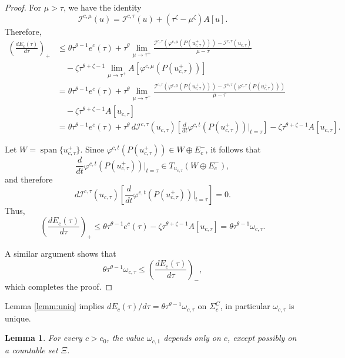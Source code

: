 \documentclass{amsart}
\theoremstyle{plain}
\newtheorem{lemma}[theorem]{Lemma}
\theoremstyle{definition}
\theoremstyle{remark}
\numberwithin{equation}{section} \numberwithin{figure}{section}
\begin{document}
{\begin{proof}
For \( \mu > \tau \), we have the identity
\[
\mathcal{I}^{c, \mu}(u) = \mathcal{I}^{c, \tau}(u) + (\tau^\zeta - \mu^\zeta) A[u].
\]
Therefore,
\begin{align*}
\left(\frac{d E_c(\tau)}{d \tau}\right)_+ 
&\leq \theta \tau^{\theta - 1} e^c(\tau) + \tau^\theta \lim_{\mu \to \tau^+} \frac{\mathcal{I}^{c, \tau}(\varphi^{c, \mu}(P(u_{c, \tau}^+))) - \mathcal{I}^{c, \tau}(u_{c, \tau})}{\mu - \tau} \\
&\quad - \zeta \tau^{\theta + \zeta - 1} \lim_{\mu \to \tau^+} A[\varphi^{c, \mu}(P(u_{c, \tau}^+))] \\
&= \theta \tau^{\theta - 1} e^c(\tau) + \tau^\theta \lim_{\mu \to \tau^+} \frac{\mathcal{I}^{c, \tau}(\varphi^{c, \mu}(P(u_{c, \tau}^+))) - \mathcal{I}^{c, \tau}(\varphi^{c, \tau}(P(u_{c, \tau}^+)))}{\mu - \tau} \\
&\quad - \zeta \tau^{\theta + \zeta - 1} A[u_{c, \tau}] \\
&= \theta \tau^{\theta - 1} e^c(\tau) + \tau^\theta \, d\mathcal{I}^{c,\tau}(u_{c, \tau}) \left[ \frac{d}{dt} \varphi^{c, t}(P(u_{c, \tau}^+))\big|_{t=\tau} \right] - \zeta \tau^{\theta + \zeta - 1} A[u_{c, \tau}].
\end{align*}

Let \( W = \operatorname{span}\{u_{c, \tau}^+\} \). Since \( \varphi^{c, t}(P(u_{c, \tau}^+)) \in W \oplus E_c^- \), it follows that
\[
\frac{d}{dt} \varphi^{c, t}(P(u_{c, \tau}^+))\big|_{t=\tau} \in T_{u_{c, \tau}}(W \oplus E_c^-),
\]
and therefore
\[
d\mathcal{I}^{c,\tau}(u_{c, \tau}) \left[ \frac{d}{dt} \varphi^{c, t}(P(u_{c, \tau}^+))\big|_{t=\tau} \right] = 0.
\]
Thus,
\[
\left(\frac{d E_c(\tau)}{d \tau}\right)_+ \leq \theta \tau^{\theta - 1} e^c(\tau) - \zeta \tau^{\theta + \zeta - 1} A[u_{c, \tau}] = \theta \tau^{\theta - 1} \omega_{c,\tau}.
\]

A similar argument shows that
\[
\theta \tau^{\theta - 1} \omega_{c,\tau} \leq \left(\frac{d E_c(\tau)}{d \tau}\right)_-,
\]
which completes the proof.
\end{proof}



Lemma \ref{lemm:uniq} implies $d {E}_c(\tau)/ d \tau =  
            \theta\tau^{\theta-1}\omega_{c,\tau}$ on $\Sigma_c^C$,  in particular $ \omega_{c, \tau}$ is unique.

            \begin{lemma}\label{un}
              For every $c > c_0$, the value $\omega_{c,1}$ depends only on $c$, except possibly on a countable set $\Xi$.
          \end{lemma}
          
}
\end{document}
